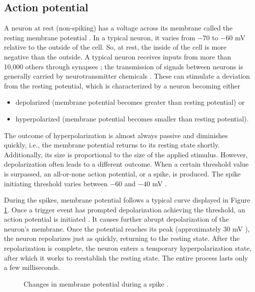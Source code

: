 \subsection{Action potential}
\label{sec:action-potential}

A neuron at rest (non-spiking) has a voltage across its membrane called the resting membrane potential \cite{KandelBook2003:6}. In a typical neuron, it varies from $-70$ to $-60$ mV relative to the outside of the cell. So, at rest, the inside of the cell is more negative than the outside. A typical neuron receives inputs from more than 10,000 others through synapses \cite{IzhikevichBook2004:2}; the transmission of signals between neurons is generally carried by neurotransmitter chemicals \cite{KandelBook2003:6}. These can stimulate a deviation from the resting potential, which is characterized by a neuron becoming either
\begin{itemize}
    \item depolarized (membrane potential becomes greater than resting potential) or
    
    \item hyperpolarized (membrane potential becomes smaller than resting potential).
\end{itemize}

The outcome of hyperpolarization is almost always passive and diminishes quickly, i.e., the membrane potential returns to its resting state shortly. Additionally, its size is proportional to the size of the applied stimulus. However, depolarization often leads to a different outcome. When a certain threshold value is surpassed, an all-or-none action potential, or a spike, is produced. The spike initiating threshold varies between $-60$ and $-40$ mV \cite{Platkiewicz2010}. 

During the spikes, membrane potential follows a typical curve displayed in Figure \ref{fig:action-potential}. Once a trigger event has prompted depolarization achieving the threshold, an action potential is initiated \cite{KandelBook2003:7}. It causes further abrupt depolarization of the neuron's membrane. Once the potential reaches its peak (approximately $30$ mV \cite{Izhikevich2003}), the neuron repolarizes just as quickly, returning to the resting state. After the repolarization is complete, the neuron enters a temporary hyperpolarization state, after which it works to reestablish the resting state. The entire process lasts only a few milliseconds.

\begin{figure}
    \centering
    
    \caption[Changes in membrane potential during a spike]{Changes in membrane potential during a spike \cite{ClarkBook2018:35.2}.}
    \label{fig:action-potential}
\end{figure}
